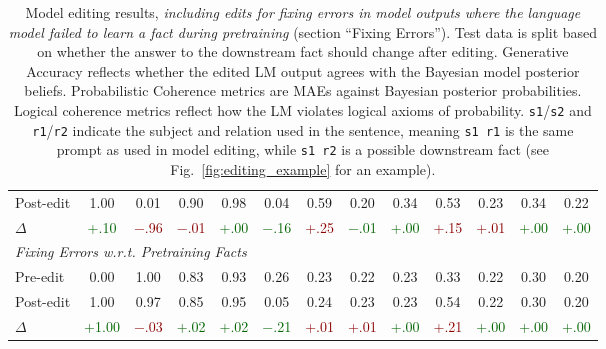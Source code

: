 \documentclass[11pt,a4paper]{article}
\begin{document}
\begin{table}
\begin{tabular}{lcccccccccccc}
 \hspace{2pt} Post-edit & 1.00 & 0.01 & 0.90 & 0.98 & 0.04 & 0.59 & 0.20 & 0.34 & 0.53 & 0.23 & 0.34 & 0.22 \\ 
 \hspace{14pt} $\Delta$ & \textcolor{darkgreen}{+.10} & \textcolor{darkred}{$-$.96}\hspace{1pt} & \textcolor{darkred}{$-$.01}\hspace{1pt} & \textcolor{darkgreen}{+.00} & \textcolor{darkgreen}{$-$.16}\hspace{1pt} & \textcolor{darkred}{+.25} & \textcolor{darkgreen}{$-$.01} & \textcolor{darkgreen}{+.00} & \textcolor{darkred}{+.15} & \textcolor{darkred}{+.01} & \textcolor{darkgreen}{+.00} & \textcolor{darkgreen}{+.00} \\
 \hline
\multicolumn{12}{l}{\hspace{-1pt}\textit{Fixing Errors w.r.t. Pretraining Facts}} \\
 \hspace{2pt} Pre-edit & 0.00 & 1.00 & 0.83 & 0.93 & 0.26 & 0.23 & 0.22 & 0.23 & 0.33 & 0.22 & 0.30 & 0.20 \\
 \hspace{2pt} Post-edit & 1.00 & 0.97 & 0.85 & 0.95 & 0.05 & 0.24 & 0.23 & 0.23 & 0.54 & 0.22 & 0.30 & 0.20 \\ 
 \hspace{14pt} $\Delta$ & \textcolor{darkgreen}{+1.00} & \textcolor{darkred}{$-$.03}\hspace{1pt} & \textcolor{darkgreen}{+.02}\hspace{1pt} & \textcolor{darkgreen}{+.02} & \textcolor{darkgreen}{$-$.21}\hspace{1pt} & \textcolor{darkred}{+.01} & \textcolor{darkred}{+.01} & \textcolor{darkgreen}{+.00} & \textcolor{darkred}{+.21} & \textcolor{darkgreen}{+.00} & \textcolor{darkgreen}{+.00} & \textcolor{darkgreen}{+.00} \\
 \hline
\end{tabular}
\caption{Model editing results, \textit{including edits for fixing errors in model outputs where the language model failed to learn a fact during pretraining} (section ``Fixing Errors''). Test data is split based on whether the answer to the downstream fact should change after editing. Generative Accuracy reflects whether the edited LM output agrees with the Bayesian model posterior beliefs. Probabilistic Coherence metrics are MAEs against Bayesian posterior probabilities. Logical coherence metrics reflect how the LM violates logical axioms of probability. \texttt{s1}/\texttt{s2} and \texttt{r1}/\texttt{r2} indicate the subject and relation used in the sentence, meaning \texttt{s1 \hspace{-5pt} r1} is the same prompt as used in model editing, while \texttt{s1 \hspace{-5pt} r2} is a possible downstream fact (see Fig.~\ref{fig:editing_example} for an example).}
\label{tab:appendix_table}
\end{table}
\end{document}
